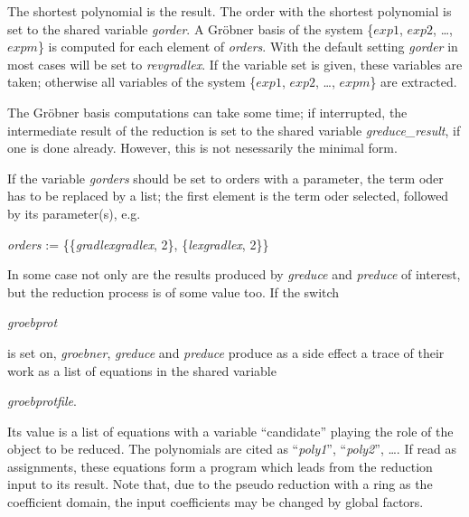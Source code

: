 The shortest polynomial is the result.
The order with the shortest polynomial is set to the shared variable
{\it gorder}. A Gr\"obner basis of the system \{$exp1$, $exp2$, \ldots ,
$expm$\} is computed for each element of \emph{orders}.
With the default setting {\it gorder} in most cases will be set
to {\it revgradlex}.
If the variable set is given, these variables are taken; otherwise all
variables of the system \{$exp1$, $exp2$, \ldots , $expm$\} are
extracted.

The Gr\"obner basis computations can take some time; if interrupted, the
intermediate result of the reduction is set to the shared variable
\emph{greduce\_result}, if one is done already. However, this is not
nesessarily the minimal form.

If the variable {\it gorders} should be set to orders with a parameter,
the term oder has to be replaced by a list; the first element is the
term oder selected, followed by its parameter(s), e.g.

\begin{center}
\emph{orders} := \{\{\emph{gradlexgradlex}, 2\}, \{\emph{lexgradlex}, 2\}\}
\end{center}

In some case not only are the results produced by \emph{greduce} and
\emph{preduce} of interest, but the reduction process is of some value
too. If the switch
\begin{center}
\emph{groebprot}
\end{center}
is set on, \emph{groebner}, \emph{greduce} and \emph{preduce} produce as a side effect
a trace of their work as a \REDUCE list of equations in the shared variable
\begin{center}
\emph{groebprotfile}.
\end{center}
Its value is a list of equations with a variable ``candidate'' playing
the role of the object to be reduced. The polynomials are cited as
``\emph{poly1}'', ``\emph{poly2}'', \ldots\;. If read as assignments, these equations
form a program which leads from the reduction input to its result.
Note that, due to the pseudo reduction with a ring as the coefficient
domain, the input coefficients may be changed by global factors.

\example {}


